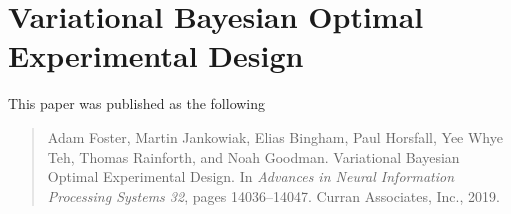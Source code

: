 \documentclass[a4paper, 10pt]{report}
\theoremstyle{plain}
\begin{document}
	
	
	
	
	
	
	\chapter{Variational Bayesian Optimal Experimental Design}
	\label{chap:vboed}
	This paper was published as the following
	\begin{quote}
		Adam Foster, Martin Jankowiak, Elias Bingham, Paul Horsfall, Yee Whye Teh, Thomas Rainforth, and Noah Goodman. Variational Bayesian Optimal Experimental Design.  In \emph{Advances in Neural Information Processing Systems 32}, pages 14036–14047. Curran Associates, Inc., 2019.
	\end{quote}
	
\end{document}
